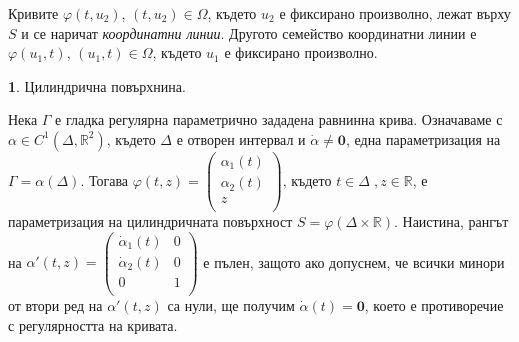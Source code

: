 \documentclass[11pt]{article}
\numberwithin{equation}{section}
\numberwithin{figure}{section}
\numberwithin{table}{section}
\theoremstyle{plain}
\theoremstyle{definition}
\theoremstyle{remark}
\theoremstyle{definition}
\theoremstyle{remark}
\theoremstyle{plain}
\theoremstyle{definition}
\theoremstyle{definition}
\newtheorem{example}[thm]{\protect\examplename}
\theoremstyle{plain}
\theoremstyle{plain}
\theoremstyle{plain}
\theoremstyle{definition}
\theoremstyle{plain}
\providecommand{\examplename}{Пример}
\renewcommand*{\Vec}[1]{\mathbf{#1}}
\newcommand*{\Z}{\Vec{0}}
\newcommand*{\R}{\mathbb{R}}
\begin{document}
\bigskip

Кривите $\varphi(t,u_2)$, $(t,u_2)\in \Omega$, където $u_2$ е фиксирано произволно, лежат върху $S$ и се наричат \textit{координатни линии}. Другото семейство координатни линии е $\varphi(u_1,t)$, $(u_1,t)\in \Omega$, където $u_1$ е фиксирано произволно.


\begin{example} \label{cylinder} Цилиндрична повърхнина.

Нека $\Gamma$ е гладка регулярна параметрично зададена равнинна крива. Означаваме с $\alpha\in C^1(\Delta , \R^2)$, където $\Delta$ е отворен интервал и $\dot\alpha \not = \Z$, една параметризация на
$\Gamma=\alpha(\Delta)$. Тогава $\varphi(t,z) = \begin{pmatrix}
	\alpha_1(t)\\
	\alpha_2(t)\\
	z\\
\end{pmatrix}$, където $t\in\Delta \;, z\in\R$, е параметризация на цилиндричната повърхност $S=\varphi(\Delta\times \R)$. Наистина, рангът на $\alpha'(t,z) = \begin{pmatrix}
	\dot\alpha_1 (t)& 0\\
	\dot\alpha_2 (t)& 0\\
	0 & 1\\
\end{pmatrix}$ е пълен, защото  ако допуснем, че всички минори от втори ред на $\alpha'(t,z)$ са нули, ще получим $\dot\alpha (t) = \Z$, което е противоречие с регулярността на кривата.
\end{example}
\end{document}
